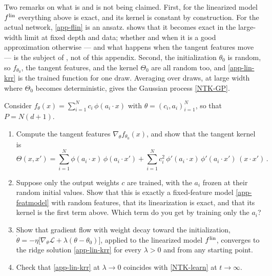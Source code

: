 \documentclass[11pt]{article}
\newcommand{\CL}{{\mathcal L}}
\begin{document}
Two remarks on what is and is not being claimed. First, for the linearized model $f^{\rm lin}$ everything above is exact, and its kernel is constant by construction. For the actual network, \eqref{app-flin} is an ansatz.  shows that it becomes exact in the large-width limit at fixed depth and data; whether and when it is a good approximation otherwise --- and what happens when the tangent features move --- is the subject of , not of this appendix. Second, the initialization $\theta_0$ is random, so $f_{\theta_0}$, the tangent features, and the kernel $\Theta_0$ are all random too, and \eqref{app-lin-krr} is the trained function for one draw. Averaging over draws, at large width where $\Theta_0$ becomes deterministic, gives the Gaussian process \eqref{NTK-GP}.

\begin{exercise}
\label{ex:app-tangent}
Consider $f_\theta(x) = \sum_{i=1}^N c_i\,\phi(a_i\cdot x)$ with $\theta = (c_i, a_i)_{i=1}^N$, so that $P = N(d+1)$.
\begin{enumerate}
  \item Compute the tangent features $\nabla_\theta f_{\theta_0}(x)$, and show that the tangent kernel is
%
\begin{equation*}
    \Theta(x,x') = \sum_{i=1}^N \phi(a_i\cdot x)\,\phi(a_i\cdot x') + \sum_{i=1}^N c_i^2\,\phi'(a_i\cdot x)\,\phi'(a_i\cdot x')\,(x\cdot x')\,.
\end{equation*}
%
  \item\label{ex:app-tangent-readout} Suppose only the output weights $c$ are trained, with the $a_i$ frozen at their random initial values. Show that this is exactly a fixed-feature model \eqref{app-featmodel} with random features, that its linearization is exact, and that its kernel is the first term above. Which term do you get by training only the $a_i$?
  \item Show that gradient flow with weight decay toward the initialization, $\dot\theta = -\eta\big[\nabla_\theta \CL + \lambda(\theta-\theta_0)\big]$, applied to the linearized model $f^{\rm lin}$, converges to the ridge solution \eqref{app-lin-krr} for every $\lambda>0$ and from any starting point.
  \item Check that \eqref{app-lin-krr} at $\lambda\to 0$ coincides with \eqref{NTK-learn} at $t\to\infty$.
\end{enumerate}
\end{exercise}
\end{document}
